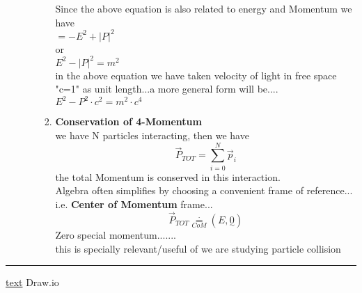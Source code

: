 \documentclass[11pt,a4paper]{article}
\begin{document}
\begin{enumerate}
\begin{enumerate}
\begin{enumerate}
                                    Since the above equation is also related to energy and Momentum we have\\
                                    $=-E^2 + \lvert P \rvert^2$\\
                                    or \\
                                    $E^2 - \lvert P \rvert^2 = m^2$\\
                                    in the above equation we have taken velocity of light in free space "c=1" as unit length...a more general form will be....\\
                                    $E^2 -  P^2 \cdot c^2= m^2\cdot c^4$\\
                              \item \textbf{Conservation of 4-Momentum}\\
                                    we have N particles interacting, then we have\\
                                    \[\vec{P}_{TOT}= \sum_{i=0}^{N}\vec{p}_{i}\]
                                    the total Momentum is conserved in this interaction.\\
                                    Algebra often simplifies by choosing a convenient frame of reference...\\
                                    i.e. \textbf{Center of Momentum} frame...\\
                                    \[\vec{P}_{TOT} \mathop = \limits^{\cdot}_{CoM} (E,\underset{\sim}{0})\]
                                    Zero special momentum.......\\
                                    this is specially relevant/useful of we are studying particle collision\\







                        \end{enumerate}
            \end{enumerate}
\end{enumerate}
\noindent\rule{\textwidth}{1pt}
\href{https://youtu.be/TiHHz3sKDbY?list=PL6Q1107aDr%SgQ1DBEugejXLfQX76hfSnX&t=1188}{text} Draw.io
\end{document}
